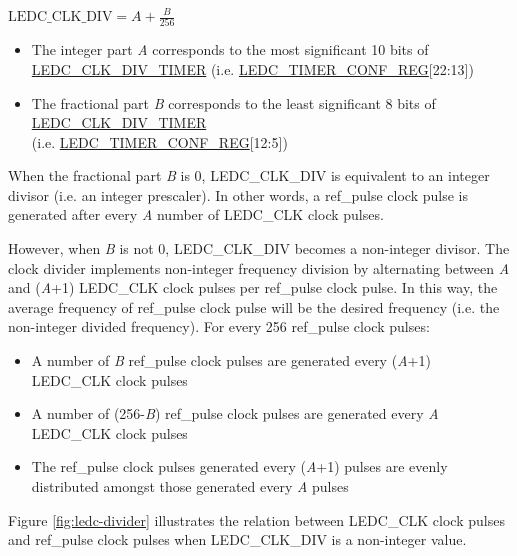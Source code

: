 \documentclass[main\_\_EN.tex]{subfiles}
\begin{document}
\begin{center}
$\textrm{LEDC\_CLK\_DIV} = A + \frac{B}{256}$
\end{center}

\begin{itemize}
    \item The integer part \textit{A} corresponds to the most significant 10 bits of \hyperref[fielddesc:LEDCCLKDIVTIMERX]{LEDC\_CLK\_DIV\_TIMER} (i.e. \hyperref[regdesc:LEDCTIMERXCONFREG]{LEDC\_TIMER\_CONF\_REG}[22:13])
    \item The fractional part \textit{B} corresponds to the least significant 8 bits of \hyperref[fielddesc:LEDCCLKDIVTIMERX]{LEDC\_CLK\_DIV\_TIMER} \\(i.e. \hyperref[regdesc:LEDCTIMERXCONFREG]{LEDC\_TIMER\_CONF\_REG}[12:5])
\end{itemize}

When the fractional part \textit{B} is 0, LEDC\_CLK\_DIV is equivalent to an integer divisor (i.e. an integer prescaler). In other words, a ref\_pulse clock pulse is generated after every \textit{A} number of LEDC\_CLK clock pulses.

However, when \textit{B} is not 0, LEDC\_CLK\_DIV becomes a non-integer divisor. The clock divider implements non-integer frequency division by alternating between \textit{A} and (\textit{A}+1) LEDC\_CLK clock pulses per ref\_pulse clock pulse. In this way, the average frequency of ref\_pulse clock pulse will be the desired frequency (i.e. the non-integer divided frequency). For every 256 ref\_pulse clock pulses:

\begin{itemize}
    \item A number of \textit{B} ref\_pulse clock pulses are generated every (\textit{A}+1) LEDC\_CLK clock pulses
    \item A number of (256-\textit{B}) ref\_pulse clock pulses are generated every \textit{A} LEDC\_CLK clock pulses
    \item The ref\_pulse clock pulses generated every (\textit{A}+1) pulses are evenly distributed amongst those generated every \textit{A} pulses
\end{itemize}

Figure \ref{fig:ledc-divider} illustrates the relation between LEDC\_CLK clock pulses and ref\_pulse clock pulses when LEDC\_CLK\_DIV is a non-integer value.
\end{document}
